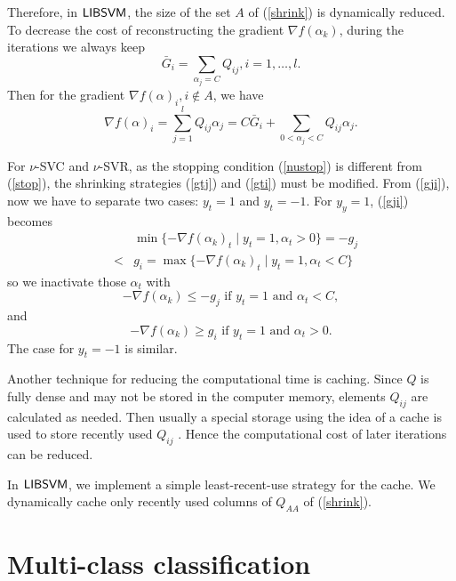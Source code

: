 \documentclass[11pt]{article}
\newcommand{\libsvm}{$\mbox{{\sf LIBSVM}}$}
\theoremstyle{break}
\begin{document}
Therefore, in \libsvm, the size of the
set $A$ of
(\ref{shrink}) is dynamically reduced.
To decrease the cost of reconstructing
the gradient 
$\nabla f(\alpha_k)$, during the iterations
we always keep 
\begin{equation*}
\bar{G}_i 
= \sum_{\alpha_j = C} Q_{ij}, i  = 1, \ldots, l. 
\end{equation*}
Then for the gradient 
$\nabla f(\alpha)_i, i \notin A$, we have
\begin{equation*}
\nabla f(\alpha)_i
= \sum_{j=1}^l 
Q_{ij} \alpha_j 
= C\bar{G}_i  + \sum_{0 < \alpha_j < C}
Q_{ij} \alpha_j.
\end{equation*}

For $\nu$-SVC and $\nu$-SVR, as the
stopping condition
(\ref{nustop})
is different from 
(\ref{stop}),
the shrinking strategies 
(\ref{gtj}) and (\ref{gti})
must be modified.
From (\ref{gji}),  now we have to 
separate two cases:
$y_t = 1$ and $y_t = -1$.
For $y_y = 1$,
(\ref{gji}) becomes 
\begin{eqnarray*}
&& \min
\{-\nabla f(\alpha_k)_t 
\mid
y_t  = 1, \alpha_t > 0\}
= -g_j \nonumber \\
& < & g_i = 
\max
\{-\nabla f(\alpha_k)_t 
\mid
y_t  = 1, \alpha_t < C\}
\end{eqnarray*}
so we inactivate those 
$\alpha_t$ with 
\begin{equation*}
-\nabla f(\alpha_k)
\leq -g_j 
\mbox{ if }
y_t = 1 \mbox{ and }
\alpha_t < C,  
\end{equation*}
and
\begin{equation*}
-\nabla f(\alpha_k)
\geq g_i 
\mbox{ if }
y_t = 1 \mbox{ and }
\alpha_t > 0.
\end{equation*}
The case for $y_t = -1$ is similar.

Another technique for reducing the
computational time 
is caching.
Since $Q$ is fully dense and may not be 
stored in the computer memory,
elements $Q_{ij}$ are calculated
as needed.
Then
usually a special storage using the idea of a cache
is used to store recently used $Q_{ij}$
.
Hence the computational cost of later iterations
can be reduced. 

In \libsvm, we implement a simple
least-recent-use strategy for the cache.
We dynamically cache only recently used
columns of $Q_{AA}$ of 
(\ref{shrink}).

\section{Multi-class classification}
\label{multi}
\end{document}
